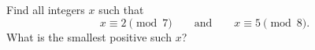 Find all integers $x$ such that
\[
x\equiv2\pmod7\qquad\text{and}\qquad x\equiv5\pmod8 .
\]
What is the smallest positive such $x$?
